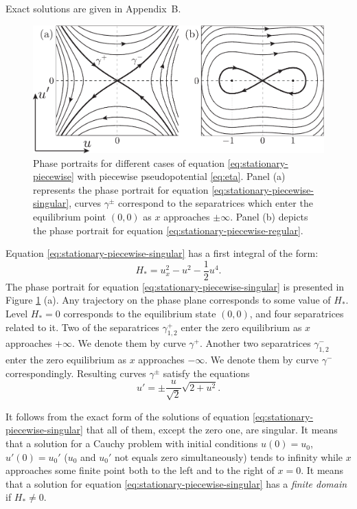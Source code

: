 Exact solutions are given in Appendix~B. %
\begin{figure}[h]
\centering
	\includegraphics[scale = 1]{pic/phase portraits}
	\caption{Phase portraits for different cases of equation \eqref{eq:stationary-piecewise} with piecewise pseudopotential \eqref{eq:eta}. Panel (a) represents the phase portrait for equation \eqref{eq:stationary-piecewise-singular}, curves $\gamma^{\pm}$ correspond to the separatrices which enter the equilibrium point $(0, 0)$ as $x$ approaches $\pm \infty$. Panel (b) depicts the phase portrait for equation \eqref{eq:stationary-piecewise-regular}.}
\label{fig:phase-portraits}
\end{figure}

Equation \eqref{eq:stationary-piecewise-singular} has a first integral of the form:
\begin{equation}
	H_* = u_x^2 - u^2 - \frac{1}{2} u^4.
\label{eq:stationary-piecewise-singular-integral}
\end{equation}
The phase portrait for equation \eqref{eq:stationary-piecewise-singular} is presented in Figure \ref{fig:phase-portraits} (a).
Any trajectory on the phase plane corresponds to some value of $H_*$.
Level $H_* = 0$ corresponds to the equilibrium state $(0, 0)$, and four separatrices related to it.
Two of the separatrices $\gamma_{1,2}^+$ enter the zero equilibrium as $x$ approaches $+\infty$.
We denote them by curve $\gamma^+$.
Another two separatrices $\gamma_{1,2}^-$ enter the zero equilibrium as $x$ approaches $-\infty$.
We denote them by curve $\gamma^-$ correspondingly.
Resulting curves $\gamma^{\pm}$ satisfy the equations
\begin{equation}
	u' = \pm \frac{u}{\sqrt{2}} \sqrt{2 + u^2}.
\end{equation}

It follows from the exact form of the solutions of equation \eqref{eq:stationary-piecewise-singular} that all of them, except the zero one, are singular.
It means that a solution for a Cauchy problem with initial conditions $u(0) = u_0$, $u'(0) = u_0'$ ($u_0$ and $u_0'$ not equals zero simultaneously) tends to infinity while $x$ approaches some finite point both to the left and to the right of $x = 0$.
It means that a solution for equation \eqref{eq:stationary-piecewise-singular} has a {\it finite domain} if $H_* \neq 0$.

